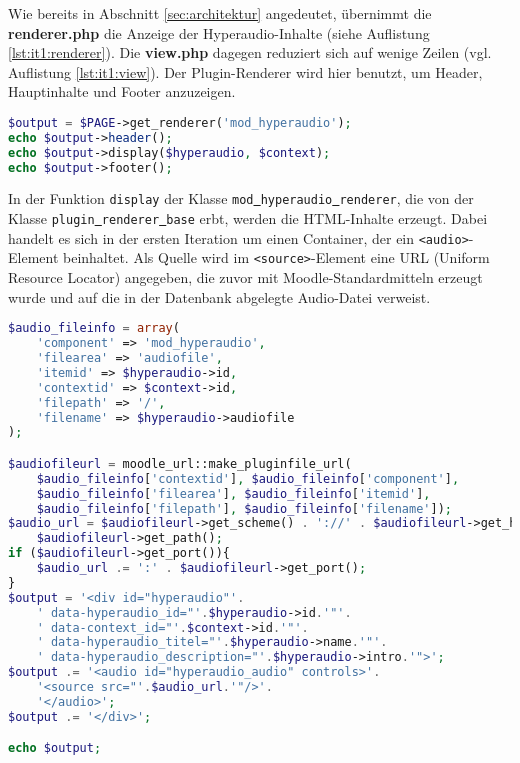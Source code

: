 Wie bereits in Abschnitt \ref{sec:architektur} angedeutet, übernimmt die \textbf{renderer.php} die Anzeige der Hyperaudio-Inhalte (siehe Auflistung \ref{lst:it1:renderer}). Die \textbf{view.php} dagegen reduziert sich auf wenige Zeilen (vgl. Auflistung \ref{lst:it1:view}). Der Plugin-Renderer wird hier benutzt, um Header, Hauptinhalte und Footer anzuzeigen.

\begin{lstlisting}[language=php,
deletekeywords={header},
             linewidth=\textwidth,
             caption={Ausschnitt der \textbf{view.php} in der 1. Iteration},
             label={lst:it1:view}]
$output = $PAGE->get_renderer('mod_hyperaudio');
echo $output->header();
echo $output->display($hyperaudio, $context);
echo $output->footer();
\end{lstlisting}

In der Funktion \texttt{display} der Klasse \mbox{\texttt{mod\underline{{ }}hyperaudio\underline{{ }}renderer}}, die von der Klasse \mbox{\texttt{plugin\underline{{ }}renderer\underline{{ }}base}} erbt, werden die HTML-Inhalte erzeugt. Dabei handelt es sich in der ersten Iteration um einen Container, der ein \texttt{<audio>}-Element beinhaltet. Als Quelle wird im \texttt{<source>}-Element eine URL (Uniform Resource Locator) angegeben, die zuvor mit Moodle-Standardmitteln erzeugt wurde und auf die in der Datenbank abgelegte Audio-Datei verweist.

\begin{lstlisting}[language=php,
             linewidth=\textwidth,
             caption={Ausschnitt der \textbf{renderer.php} in der 1. Iteration},
             label={lst:it1:renderer}]
$audio_fileinfo = array(
    'component' => 'mod_hyperaudio',
    'filearea' => 'audiofile',
    'itemid' => $hyperaudio->id,
    'contextid' => $context->id,
    'filepath' => '/',
    'filename' => $hyperaudio->audiofile
);

$audiofileurl = moodle_url::make_pluginfile_url(
    $audio_fileinfo['contextid'], $audio_fileinfo['component'],
    $audio_fileinfo['filearea'], $audio_fileinfo['itemid'],
    $audio_fileinfo['filepath'], $audio_fileinfo['filename']);
$audio_url = $audiofileurl->get_scheme() . '://' . $audiofileurl->get_host() .
    $audiofileurl->get_path();
if ($audiofileurl->get_port()){
    $audio_url .= ':' . $audiofileurl->get_port();
}
$output = '<div id="hyperaudio"'.
    ' data-hyperaudio_id="'.$hyperaudio->id.'"'.
    ' data-context_id="'.$context->id.'"'.
    ' data-hyperaudio_titel="'.$hyperaudio->name.'"'.
    ' data-hyperaudio_description="'.$hyperaudio->intro.'">';
$output .= '<audio id="hyperaudio_audio" controls>'.
    '<source src="'.$audio_url.'"/>'.
    '</audio>';
$output .= '</div>';

echo $output;
\end{lstlisting}

